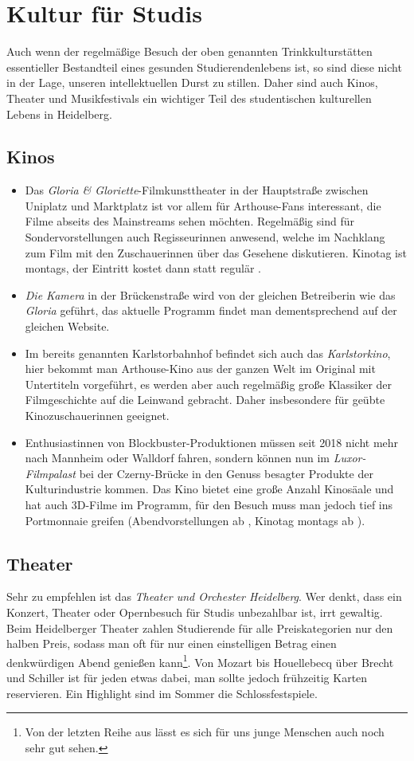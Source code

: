 
\section{Kultur für Studis}

Auch wenn der regelmäßige Besuch der oben genannten Trinkkulturstätten essentieller Bestandteil eines gesunden Studierendenlebens ist, so sind diese nicht in der Lage, unseren intellektuellen Durst zu stillen. Daher sind auch Kinos, Theater und Musikfestivals ein wichtiger Teil des studentischen kulturellen Lebens in Heidelberg.

\subsection{Kinos}
\begin{itemize}
\item Das \emph{Gloria \& Gloriette}-Filmkunsttheater in der Hauptstraße zwischen Uniplatz und Marktplatz ist vor allem für Arthouse-Fans interessant, die Filme abseits des Mainstreams sehen möchten. Regelmäßig sind für Sondervorstellungen auch Regisseurinnen anwesend, welche im Nachklang zum Film mit den Zuschauerinnen über das Gesehene diskutieren. Kinotag ist montags, der Eintritt kostet dann  statt regulär .
\item \emph{Die Kamera} in der Brückenstraße wird von der gleichen Betreiberin wie das \emph{Gloria} geführt, das aktuelle Programm findet man dementsprechend auf der gleichen Website.
\item Im bereits genannten Karlstorbahnhof befindet sich auch das \emph{Karlstorkino}, hier bekommt man Arthouse-Kino aus der ganzen Welt im Original mit Untertiteln vorgeführt, es werden aber auch regelmäßig große Klassiker der Filmgeschichte auf die Leinwand gebracht. Daher insbesondere für geübte Kinozuschauerinnen geeignet.
\item Enthusiastinnen von Blockbuster-Produktionen müssen seit 2018 nicht mehr nach Mannheim oder Walldorf fahren, sondern können nun im \emph{Luxor-Filmpalast} bei der Czerny-Brücke in den Genuss besagter Produkte der Kulturindustrie kommen. Das Kino bietet eine große Anzahl Kinosäale und hat auch 3D-Filme im Programm, für den Besuch muss man jedoch tief ins Portmonnaie greifen (Abendvorstellungen ab , Kinotag montags ab ).
\end{itemize} 

\subsection{Theater}
Sehr zu empfehlen ist das \emph{Theater und Orchester Heidelberg}. Wer denkt, dass ein Konzert, Theater oder Opernbesuch für Studis unbezahlbar ist, irrt gewaltig. Beim Heidelberger Theater zahlen Studierende für alle Preiskategorien nur den halben Preis, sodass man oft für nur einen einstelligen Betrag einen denkwürdigen Abend genießen kann\footnote{Von der letzten Reihe aus lässt es sich für uns junge Menschen auch noch sehr gut sehen.}. Von Mozart bis Houellebecq über Brecht und Schiller ist für jeden etwas dabei, man sollte jedoch frühzeitig Karten reservieren. Ein Highlight sind im Sommer die Schlossfestspiele.

